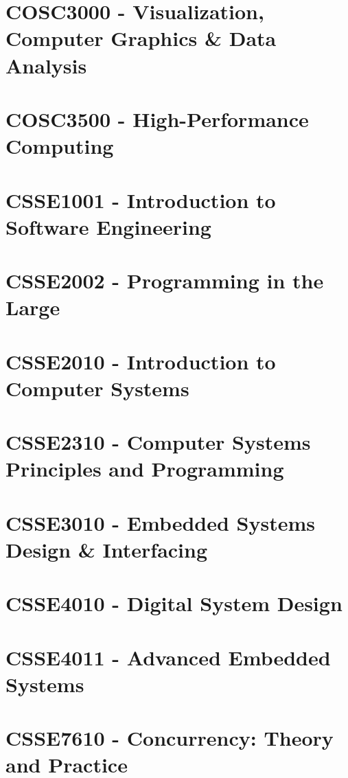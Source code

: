 \documentclass[a4paper,12pt]{report}
\begin{document}
\hypertarget{COSC3000}{\section{COSC3000 - Visualization, Computer Graphics \& Data Analysis}}

\hypertarget{COSC3500}{\section{COSC3500 - High-Performance Computing}}

\hypertarget{CSSE1001}{\section{CSSE1001 - Introduction to Software Engineering}}

\hypertarget{CSSE2002}{\section{CSSE2002 - Programming in the Large}}

\hypertarget{CSSE2010}{\section{CSSE2010 - Introduction to Computer Systems}}

\hypertarget{CSSE2310}{\section{CSSE2310 - Computer Systems Principles and Programming}}

\hypertarget{CSSE3010}{\section{CSSE3010 - Embedded Systems Design \& Interfacing}}

\hypertarget{CSSE4010}{\section{CSSE4010 - Digital System Design}}

\hypertarget{CSSE4011}{\section{CSSE4011 - Advanced Embedded Systems}}

\hypertarget{CSSE7610}{\section{CSSE7610 - Concurrency: Theory and Practice}}
\end{document}
